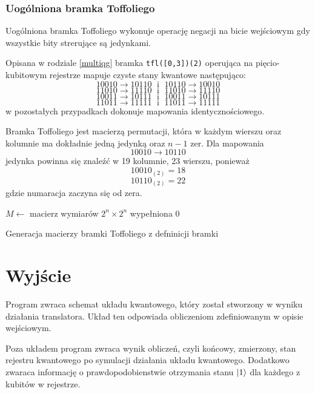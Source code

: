 \subsubsection{Uogólniona bramka Toffoliego}
Uogólniona bramka Toffoliego wykonuje operację negacji na bicie wejściowym gdy wszystkie bity strerujące są jedynkami.
\par Opisana w rodziale \ref{multiqg} bramka \texttt{tfl([0,3])(2)} operująca na pięcio-kubitowym rejestrze mapuje czyste stany kwantowe następująco:
\[10010  \rightarrow 10110\;\text{ i }\;10110  \rightarrow 10010\] %
\[11010  \rightarrow 11110\;\text{ i }\;11010  \rightarrow 11110\] %
\[10011  \rightarrow 10111\;\text{ i }\;10011  \rightarrow 10111\] %
\[11011  \rightarrow 11111\;\text{ i }\;11011  \rightarrow 11111\] %
w pozostałych przypadkach dokonuje mapowania identycznościowego.
\par Bramka Toffoliego jest macierzą permutacji, która w każdym wierszu oraz kolumnie ma dokładnie jedną jedynką oraz $n-1$ zer. Dla mapowania
\[10010  \rightarrow 10110\]
jedynka powinna się znaleźć w 19 kolumnie, 23 wierszu, ponieważ 
\[10010_{(2)} = 18\]
\[10110_{(2)} = 22\]
gdzie numaracja zaczyna się od zera.\\
\begin{pseudokod}[H]
    $M \leftarrow$ macierz wymiarów $2^n \times 2^n$ wypełniona 0\;
    \caption{Generacja macierzy bramki Toffoliego z defninicji bramki}\label{alg:toffoliGateGen}
\end{pseudokod}
\section{Wyjście}
Program zwraca schemat układu kwantowego, który został stworzony w wyniku działania translatora. Układ ten odpowiada obliczeniom zdefiniowanym w opisie wejściowym.
\par Poza układem program zwraca wynik obliczeń, czyli końcowy, zmierzony, stan rejestru kwantowego po symulacji działania układu kwantowego. Dodatkowo zwaraca informację o prawdopodobienstwie otrzymania stanu $\ket{1}$ dla każdego z kubitów w rejestrze.